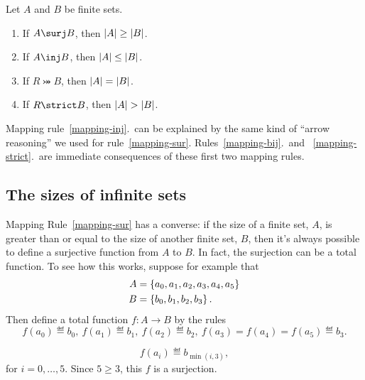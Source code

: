 \begin{lemma}\label{mapruldef}
 \mbox{}
Let $A$ and $B$ be finite sets.

\begin{enumerate}

\item\label{mapping-sur} If $A \surj B$, then $\left|A\right| \geq \left|B\right|$.

\item\label{mapping-inj} If $A \inj B$, then $\left|A\right| \leq \left|B\right|$.

\item\label{mapping-bij} If $R \bij B$, then $\left|A\right| = \left|B\right|$.

\item\label{mapping-strict} If $R \strict B$, then $\left|A\right| > \left|B\right|$.

\end{enumerate}

\end{lemma}

Mapping rule~\ref{mapping-inj}.\ can be explained by the same kind of
``arrow reasoning'' we used for rule~\ref{mapping-sur}.
Rules~\ref{mapping-bij}.\ and ~\ref{mapping-strict}.\ are immediate
consequences of these first two mapping rules.

\subsection{The sizes of infinite sets}

Mapping Rule~\ref{mapping-sur} has a converse:
if the size of a finite set, $A$, is greater than or equal to the size of
another finite set, $B$, then it's always possible to define a
surjective function from $A$ to $B$.  In fact, the surjection can be a
total function.  To see how this works, suppose for example that
\begin{align*}
A & =\left\{a_0,a_1,a_2,a_3,a_4,a_5\right\}\\
B & =\left\{b_0,b_1,b_2,b_3\right\}.
\end{align*}
Then define a total function $f:A\to B$ by the rules
\[
f(a_0) \eqdef b_0,\  f(a_1) \eqdef b_1,\  f(a_2) \eqdef b_2,\  f(a_3)=
f(a_4)=f(a_5) \eqdef b_3.
\]

\begin{editingnotes}

\[
f(a_i) \eqdef b_{\min(i,3)},
\]
for $i=0, \dots, 5$.  Since $5 \geq 3$, this $f$ is a surjection.
\end{editingnotes}


